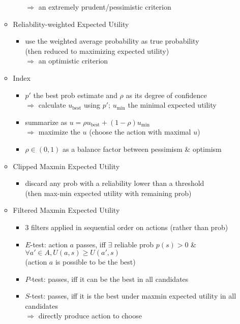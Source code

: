 \begin{itemize}
\begin{itemize}
\begin{itemize}
		$\Rightarrow$ an extremely prudent/pessimistic criterion
		\end{itemize}
	\item Reliability-weighted Expected Utility
		\begin{itemize}
		\item use the weighted average probability as true probability \\
		(then reduced to maximizing expected utility) \\
		$\Rightarrow$ an optimistic criterion
		\end{itemize}
	\item Index
		\begin{itemize}
		\item $p'$ the best prob estimate and $\rho$ as its degree of confidence \\
		$\Rightarrow$ calculate $u_\text{best}$ using $p'$; $u_\text{min}$ the minimal expected utility
		\item summarize as $u = \rho u_\text{best} + (1-\rho)u_\text{min}$ \\
		$\Rightarrow$ maximize the $u$ (choose the action with maximal $u$)
		\item $\rho\in(0,1)$ as a balance factor between pessimism \& optimism 
		\end{itemize}
	\item Clipped Maxmin Expected Utility
		\begin{itemize}
		\item discard any prob with a reliability lower than a threshold \\
		(then max-min expected utility with remaining prob)
		\end{itemize}
	\item Filtered Maxmin Expected Utility
		\begin{itemize}
		\item $3$ filters applied in sequential order on actions (rather than prob)
		\item $E$-test: action $a$ passes, iff $\exists$ reliable prob $p(s)>0$ \& $\forall a'\in A, U(a,s)\ge U(a',s)$ \\
		(action $a$ is possible to be the best)
		\item $P$-test: passes, iff it can be the best in all candidates
		\item $S$-test: passes, iff it is the best under maxmin expected utility in all candidates \\
		$\Rightarrow$ directly produce action to choose
		\end{itemize}
	\end{itemize}
\end{itemize}
